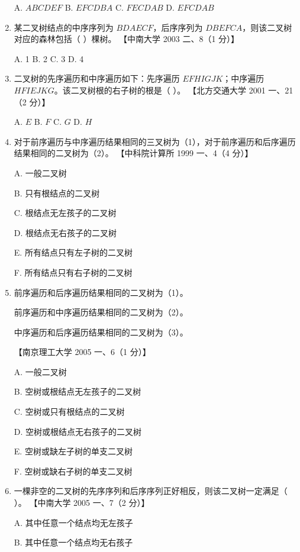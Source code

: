 \documentclass[lang=cn,newtx,10pt,scheme=chinese]{elegantbook}
\begin{document}
\begin{enumerate}
    A. $ABCDEF$ \quad B. $EFCDBA$ \quad C. $FECDAB$ \quad D. $EFCDAB$  

    \item 某二叉树结点的中序序列为 $BDAECF$，后序序列为 $DBEFCA$，则该二叉树对应的森林包括（ ）棵树。  
    【中南大学 2003 二、8（1 分）】  

    A. 1 \quad B. 2 \quad C. 3 \quad D. 4  

    \item 二叉树的先序遍历和中序遍历如下：先序遍历 $EFHIGJK$；中序遍历 $HFIEJKG$。该二叉树根的右子树的根是（ ）。  
    【北方交通大学 2001 一、21（2 分）】  

    A. $E$ \quad B. $F$ \quad C. $G$ \quad D. $H$  

    \item 对于前序遍历与中序遍历结果相同的三叉树为（1），对于前序遍历和后序遍历结果相同的二叉树为（2）。  
    【中科院计算所 1999 一、4（4 分）】  

    A. 一般二叉树  

    B. 只有根结点的二叉树  

    C. 根结点无左孩子的二叉树  

    D. 根结点无右孩子的二叉树  

    E. 所有结点只有左子树的二叉树 

    F. 所有结点只有右子树的二叉树  

    \item 前序遍历和后序遍历结果相同的二叉树为（1）。  
    
    前序遍历和中序遍历结果相同的二叉树为（2）。

    中序遍历和后序遍历结果相同的二叉树为（3）。 

    【南京理工大学 2005 一、6（1 分）】  

    A. 一般二叉树  

    B. 空树或根结点无左孩子的二叉树  

    C. 空树或只有根结点的二叉树  

    D. 空树或根结点无右孩子的二叉树  

    E. 空树或缺左子树的单支二叉树  

    F. 空树或缺右子树的单支二叉树  

    \item 一棵非空的二叉树的先序序列和后序序列正好相反，则该二叉树一定满足（ ）。  
    【中南大学 2005 一、7（2 分）】  

    A. 其中任意一个结点均无左孩子 

    B. 其中任意一个结点均无右孩子  


\end{enumerate}
\end{document}
